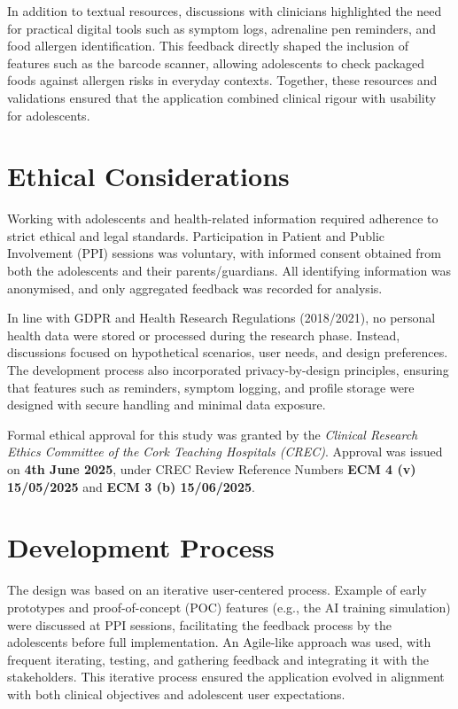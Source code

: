 \documentclass[MScCS]{uccthesis}
\begin{document}
In addition to textual resources, discussions with clinicians highlighted the need for practical digital tools such as symptom logs, adrenaline pen reminders, and food allergen identification. This feedback directly shaped the inclusion of features such as the barcode scanner, allowing adolescents to check packaged foods against allergen risks in everyday contexts. Together, these resources and validations ensured that the application combined clinical rigour with usability for adolescents.
 

\section{Ethical Considerations}
Working with adolescents and health-related information required adherence to strict ethical and legal standards. Participation in Patient and Public Involvement (PPI) sessions was voluntary, with informed consent obtained from both the adolescents and their parents/guardians. All identifying information was anonymised, and only aggregated feedback was recorded for analysis.  

In line with GDPR and Health Research Regulations (2018/2021), no personal health data were stored or processed during the research phase. Instead, discussions focused on hypothetical scenarios, user needs, and design preferences. The development process also incorporated privacy-by-design principles, ensuring that features such as reminders, symptom logging, and profile storage were designed with secure handling and minimal data exposure.  

Formal ethical approval for this study was granted by the \textit{Clinical Research Ethics Committee of the Cork Teaching Hospitals (CREC)}. Approval was issued on \textbf{4th June 2025}, under CREC Review Reference Numbers \textbf{ECM 4 (v) 15/05/2025} and \textbf{ECM 3 (b) 15/06/2025}.  



\section{Development Process}
The design was based on an iterative user-centered process. Example of early prototypes and proof-of-concept (POC) features (e.g., the AI training simulation) were discussed at PPI sessions, facilitating the feedback process by the adolescents before full implementation. An Agile-like approach was used, with frequent iterating, testing, and gathering feedback and integrating it with the stakeholders. This iterative process ensured the application evolved in alignment with both clinical objectives and adolescent user expectations.
\end{document}

